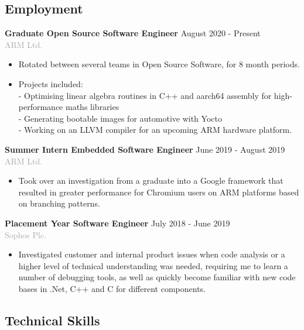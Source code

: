 \documentclass[11pt]{article}
\newcommand{\dash}{\item[-]}
\newcommand{\linesep}{\noindent\makebox[\linewidth]{\rule{\linewidth}{0.2pt}}}
\begin{document}
 \subsection*{Employment}
\textbf{Graduate Open Source Software Engineer} \hfill August 2020 - Present \\
\textcolor{darkgray}{ARM Ltd.}
  \begin{itemize}
   \dash Rotated between several teams in Open Source Software, for 8 month periods. 
   \dash Projects included: \\ -  Optimising linear algebra routines in C++ and aarch64 assembly for high-performance maths libraries
\\ -  Generating bootable images for automotive with Yocto
\\ -  Working on an LLVM compiler for an upcoming ARM hardware platform.
  \end{itemize}
\vspace{10pt}
\textbf{Summer Intern Embedded Software Engineer} \hfill June 2019 - August 2019 \\
\textcolor{darkgray}{ARM Ltd.}
  \begin{itemize}
   \dash Took over an investigation from a graduate into a Google framework that resulted in greater performance for Chromium users on ARM platforms based on branching patterns.
  \end{itemize}
\vspace{10pt}
\textbf{Placement Year Software Engineer} \hfill July 2018 - June 2019 \\
\textcolor{darkgray}{Sophos Plc.}
  \begin{itemize}
   \dash Investigated customer and internal product issues when code analysis or a higher level of technical understanding was needed, requiring me to learn a number of debugging tools, as well as quickly become familiar with new code bases in .Net, C++ and C for different components.
  \end{itemize}

  \linesep

  \subsection*{Technical Skills}
   \renewcommand\tabularxcolumn[1]{b{#1}}%
\end{document}
